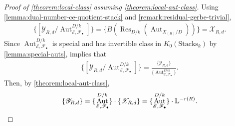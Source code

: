 \documentclass[12 pt]{amsart}
\theoremstyle{plain}
\theoremstyle{definition}
\theoremstyle{remark}
\numberwithin{equation}{section}
\newcommand\bl{\mathbb L}
\newcommand\bp{\mathbb P}
\newcommand\sce{\mathscr E}
\newcommand\scf{\mathscr F}
\newcommand\scx{\mathscr X}
\newcommand\scy{\mathscr Y}
\newcommand\scz{\mathscr Z}
\newcommand\stbgrp[2]{\mathrm{H}_{#1,#2}} %
\newcommand\resgrp[1]{\mathrm{G}_{#1}} %
\newcommand\reshilb[2]{\scz_{#1,#2}} %
\newcommand\ressections[2]{\scy_{#1,#2}} %
\newcommand\gerbe[2]{\scx_{#1,#2}} %
\DeclareMathOperator\res{Res}
\newcommand\grStacks{K_0(\mathrm{Stacks}_k)} %
\DeclareMathOperator\pgl{PGL}
\DeclareMathOperator\aut{Aut}
\DeclareMathOperator\gl{GL}
\begin{document}
\begin{proof}[Proof of \autoref{theorem:local-class} assuming
	\autoref{theorem:local-aut-class}] 
%
%
Using
\autoref{lemma:dual-number-ce-quotient-stack} and
\autoref{remark:residual-gerbe-trivial},
\begin{align*}
	\{[\ressections R
	d/\aut^{D/k}_{\sce, \scf_\bullet}]\} = \{B
	(\res_{D/k}(\aut_{X_{(R)}/D}))\} = \gerbe R d.  
\end{align*}
Since
$\aut^{D/k}_{\sce, \scf_\bullet}$ is special and has invertible class in
$\grStacks$ by \autoref{lemma:special-auts}, 
\cite[Prop.\ 1.4(i), Prop.\
1.1(ix)]{Ekedahl2009}
implies that
\begin{align*} \{[\ressections R d/\aut^{D/k}_{\sce, \scf_\bullet}]\}  =
\frac{\{\ressections R d\}}{\{\aut^{D/k}_{\sce, \scf_\bullet}\}}.  \end{align*}
Then, by \autoref{theorem:local-aut-class},
\begin{equation} \{\ressections R d\} =
\{\aut^{D/k}_{\sce, \scf_\bullet}\} \cdot \{\gerbe R d \} =
\{\aut^{D/k}_{\sce, \scf_\bullet}\} \cdot \bl^{-r(R)}.  \qedhere \end{equation}
\end{proof}
\end{document}
